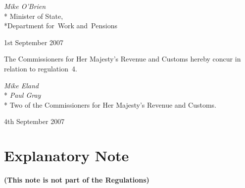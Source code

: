 \documentclass[12pt,a4paper]{article}
\begin{document}
{\raggedleft
\emph{Mike O'Brien}\\*
Minister
of State,\\*Department 
for~Work and~Pensions

}

1st September 2007

\pagebreak[3]

\bigskip

The Commissioners for Her Majesty’s Revenue and Customs hereby concur in relation to regulation~4. 

{\raggedleft
\emph{Mike Eland}\\*
\emph{Paul Gray}\\*
Two of the Commissioners for Her Majesty’s Revenue and Customs.

}

4th September 2007

\small

\part{Explanatory Note}

\renewcommand\parthead{— Explanatory Note}

\subsection*{(This note is not part of the Regulations)}
\end{document}
